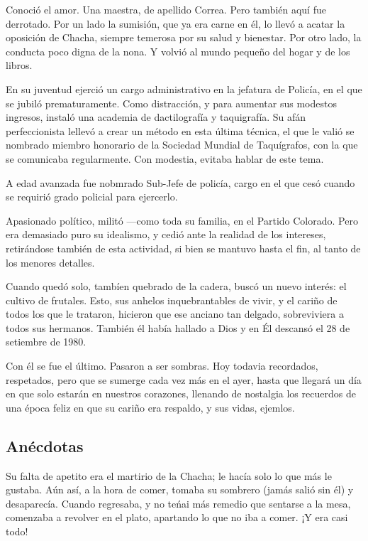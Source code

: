\documentclass{article}
\begin{document}
Conoció el amor. Una maestra, de apellido Correa. Pero también aquí fue derrotado. Por un lado la sumisión, que ya era carne en él, lo llevó a acatar la oposición de Chacha, siempre temerosa por su salud y bienestar. Por otro lado, la conducta poco digna de la nona. Y volvió al mundo pequeño del hogar y de los libros.

En su juventud ejerció un cargo administrativo en la jefatura de Policía, en el que se jubiló prematuramente. Como distracción, y para aumentar sus modestos ingresos, instaló una academia de dactilografía y taquigrafía. Su afán perfeccionista lellevó a crear un método en esta última técnica, el que le valió se nombrado miembro honorario de la Sociedad Mundial de Taquígrafos, con la que se comunicaba regularmente. Con modestia, evitaba hablar de este tema.

A edad avanzada fue nobmrado Sub-Jefe de policía, cargo en el que cesó cuando se requirió grado policial para ejercerlo.

Apasionado político, militó ---como toda su familia, en el Partido Colorado. Pero era demasiado puro su idealismo, y cedió ante la realidad de los intereses, retirándose también de esta actividad, si bien se mantuvo hasta el fin, al tanto de los menores detalles.

Cuando quedó solo, tambíen quebrado de la cadera, buscó un nuevo interés: el cultivo de frutales. Esto, sus anhelos inquebrantables de vivir, y el cariño de todos los que le trataron, hicieron que ese anciano tan delgado, sobreviviera a todos sus hermanos. También él había hallado a Dios y en Él descansó el 28 de setiembre de 1980.

Con él se fue el último. Pasaron a ser sombras. Hoy todavia recordados, respetados, pero que se sumerge cada vez más en el ayer, hasta que llegará un día en que solo estarán en nuestros corazones, llenando de nostalgia los recuerdos de una época feliz en que su cariño era respaldo, y sus vidas, ejemlos.

\subsection{Anécdotas}

Su falta de apetito era el martirio de la Chacha; le hacía solo lo que más le gustaba. Aún así, a la hora de comer, tomaba su sombrero (jamás salió sin él) y desaparecía. Cuando regresaba, y no teńai más remedio que sentarse a la mesa, comenzaba a revolver en el plato, apartando lo que no iba a comer. ¡Y era casi todo!
\end{document}
